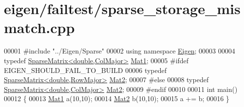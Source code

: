 \hypertarget{eigen_2failtest_2sparse__storage__mismatch_8cpp_source}{}\section{eigen/failtest/sparse\+\_\+storage\+\_\+mismatch.cpp}
\label{eigen_2failtest_2sparse__storage__mismatch_8cpp_source}

\begin{DoxyCode}
00001 \textcolor{preprocessor}{#include "../Eigen/Sparse"}
00002 \textcolor{keyword}{using namespace }\hyperlink{namespace_eigen}{Eigen};
00003 
00004 \textcolor{keyword}{typedef} \hyperlink{group___sparse_core___module_class_eigen_1_1_sparse_matrix}{SparseMatrix<double,ColMajor>} \hyperlink{group___sparse_core___module_class_eigen_1_1_sparse_matrix}{Mat1};
00005 \textcolor{preprocessor}{#ifdef EIGEN\_SHOULD\_FAIL\_TO\_BUILD}
00006 \textcolor{keyword}{typedef} \hyperlink{group___sparse_core___module_class_eigen_1_1_sparse_matrix}{SparseMatrix<double,RowMajor>} \hyperlink{group___sparse_core___module_class_eigen_1_1_sparse_matrix}{Mat2};
00007 \textcolor{preprocessor}{#else}
00008 \textcolor{keyword}{typedef} \hyperlink{group___sparse_core___module_class_eigen_1_1_sparse_matrix}{SparseMatrix<double,ColMajor>} \hyperlink{group___sparse_core___module_class_eigen_1_1_sparse_matrix}{Mat2};
00009 \textcolor{preprocessor}{#endif}
00010 
00011 \textcolor{keywordtype}{int} main()
00012 \{
00013   \hyperlink{group___sparse_core___module_class_eigen_1_1_sparse_matrix}{Mat1} a(10,10);
00014   \hyperlink{group___sparse_core___module_class_eigen_1_1_sparse_matrix}{Mat2} b(10,10);
00015   a += b;
00016 \}
\end{DoxyCode}
